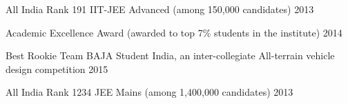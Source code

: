 
\begin{cvhonors}
	
%	
	\cvhonor
	{All India Rank 191 } %
	{IIT-JEE Advanced (among 150,000 candidates)} %
	{} %
	{2013} %
	
	\cvhonor
	{Academic Excellence Award} %
	{(awarded to top 7\% students in the institute) } %
	{} %
	{2014} %
	
	\cvhonor
	{Best Rookie Team} %
	{BAJA Student India, an inter-collegiate All-terrain vehicle design competition} %
	{} %
	{2015} %
	
	\cvhonor
	{All India Rank 1234} %
	{JEE Mains (among 1,400,000 candidates)} %
	{} %
	{2013} %
	
%	
%	
\end{cvhonors}